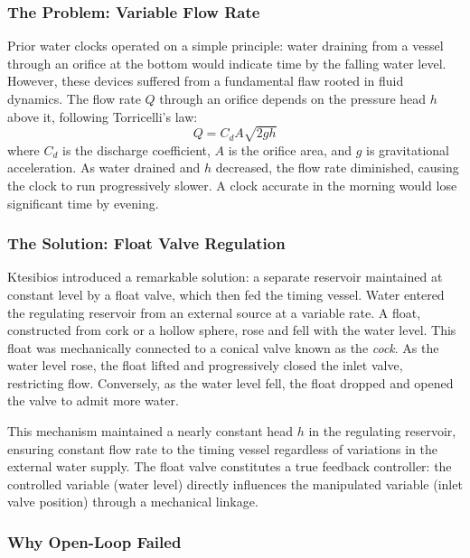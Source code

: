 \subsubsection{The Problem: Variable Flow Rate}

Prior water clocks operated on a simple principle: water draining from a vessel through an orifice at the bottom would indicate time by the falling water level. However, these devices suffered from a fundamental flaw rooted in fluid dynamics. The flow rate $Q$ through an orifice depends on the pressure head $h$ above it, following Torricelli's law:
\begin{equation}
Q = C_d A \sqrt{2gh}
\label{eq:torricelli}
\end{equation}
where $C_d$ is the discharge coefficient, $A$ is the orifice area, and $g$ is gravitational acceleration. As water drained and $h$ decreased, the flow rate diminished, causing the clock to run progressively slower. A clock accurate in the morning would lose significant time by evening.

\subsubsection{The Solution: Float Valve Regulation}

Ktesibios introduced a remarkable solution: a separate reservoir maintained at constant level by a float valve, which then fed the timing vessel. Water entered the regulating reservoir from an external source at a variable rate. A float, constructed from cork or a hollow sphere, rose and fell with the water level. This float was mechanically connected to a conical valve known as the \textit{cock}. As the water level rose, the float lifted and progressively closed the inlet valve, restricting flow. Conversely, as the water level fell, the float dropped and opened the valve to admit more water.

This mechanism maintained a nearly constant head $h$ in the regulating reservoir, ensuring constant flow rate to the timing vessel regardless of variations in the external water supply. The float valve constitutes a true feedback controller: the controlled variable (water level) directly influences the manipulated variable (inlet valve position) through a mechanical linkage.

\subsubsection{Why Open-Loop Failed}

